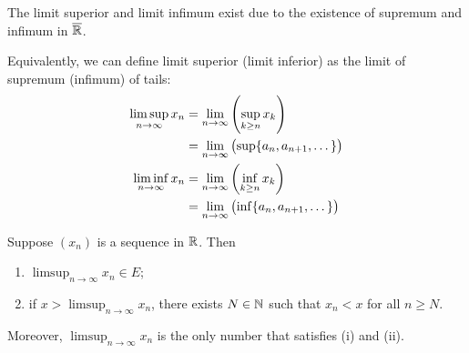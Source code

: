 \begin{remark}
The limit superior and limit infimum exist due to the existence of supremum and infimum in $\overline{\mathbb R}$.
\end{remark}

Equivalently, we can define limit superior (limit inferior) as the limit of supremum (infimum) of tails:
\begin{align*}
\limsup_{n\to\infty}x_n&=\lim_{n\to\infty}\left(\sup_{k\ge n}x_k\right)\\
&=\lim_{n\to\infty}\left(\sup\{a_n,a_{n+1},\dots\}\right)\\
\liminf_{n\to\infty}x_n&=\lim_{n\to\infty}\left(\inf_{k\ge n}x_k\right)\\
&=\lim_{n\to\infty}\left(\inf\{a_n,a_{n+1},\dots\}\right)\\
\end{align*}

\begin{proposition}
Suppose $(x_n)$ is a sequence in $\mathbb R$. Then
\begin{enumerate}[label=(\roman*)]
\item $\displaystyle\limsup_{n\to\infty}x_n\in E$;
\item if $\displaystyle x>\limsup_{n\to\infty}x_n$, there exists $N\in\mathbb N$ such that $x_n<x$ for all $n\ge N$.
\end{enumerate}
Moreover, $\displaystyle\limsup_{n\to\infty}x_n$ is the only number that satisfies (i) and (ii).
\end{proposition}

